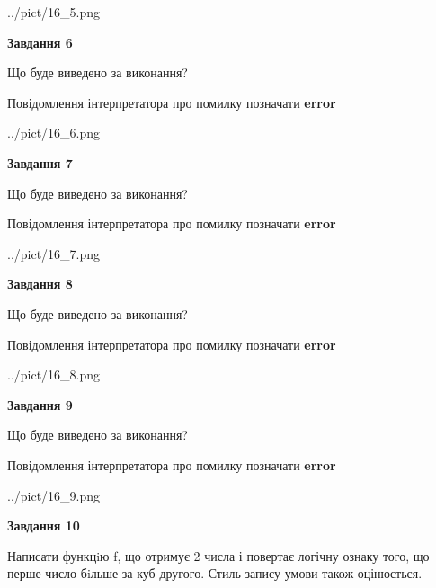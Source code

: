 \documentclass[12pt, ukrainian]{article}
\begin{document}
{\begin {large}
\begin{center}
	{../pict/16_5.png}
\end{center}
\newpage

{\begin {center}\textbf{Завдання 6}\end {center}}\par
Що буде виведено за виконання? \par
Повідомлення інтерпретатора про помилку позначати \textbf{error}

\begin{center}
	{../pict/16_6.png}
\end{center}
\newpage

{\begin {center}\textbf{Завдання 7}\end {center}}\par
Що буде виведено за виконання? \par
Повідомлення інтерпретатора про помилку позначати \textbf{error}

\begin{center}
	{../pict/16_7.png}
\end{center}
\newpage

{\begin {center}\textbf{Завдання 8}\end {center}}\par
Що буде виведено за виконання? \par
Повідомлення інтерпретатора про помилку позначати \textbf{error}

\begin{center}
	{../pict/16_8.png}
\end{center}
\newpage

{\begin {center}\textbf{Завдання 9}\end {center}}\par
Що буде виведено за виконання? \par
Повідомлення інтерпретатора про помилку позначати \textbf{error}

\begin{center}
	{../pict/16_9.png}
\end{center}
\newpage

{\begin {center}\textbf{Завдання 10}\end {center}}\par

Написати функцiю f, що отримує 2 числа і повертає логічну ознаку того, що перше число бiльше за куб другого. Стиль запису умови також оцінюється.\par
\newpage

\end {large}}
\end{document}
